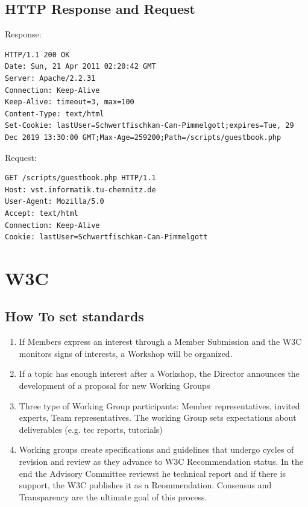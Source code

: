 \documentclass[11pt]{article}
\begin{document}
\subsection{HTTP Response and Request}
\label{sec:orga3498c2}
Response:
\lstset{breaklines=true,language=sh,label= ,caption= ,captionpos=b,numbers=none}
\begin{lstlisting}
HTTP/1.1 200 OK
Date: Sun, 21 Apr 2011 02:20:42 GMT
Server: Apache/2.2.31
Connection: Keep-Alive
Keep-Alive: timeout=3, max=100
Content-Type: text/html
Set-Cookie: lastUser=Schwertfischkan-Can-Pimmelgott;expires=Tue, 29 Dec 2019 13:30:00 GMT;Max-Age=259200;Path=/scripts/guestbook.php
\end{lstlisting}
Request:
\lstset{breaklines=true,language=sh,label= ,caption= ,captionpos=b,numbers=none}
\begin{lstlisting}
GET /scripts/guestbook.php HTTP/1.1
Host: vst.informatik.tu-chemnitz.de
User-Agent: Mozilla/5.0
Accept: text/html
Connection: Keep-Alive
Cookie: lastUser=Schwertfischkan-Can-Pimmelgott
\end{lstlisting}
\section{W3C}
\label{sec:org03905bc}
\subsection{How To set standards}
\label{sec:org7d2555a}
\begin{enumerate}
\item If Members express an interest through a Member Submission and the W3C monitors signs of interests, a Workshop will be organized.
\item If a topic has enough interest after a Workshop, the Director announces the development of a proposal for new Working Groups
\item Three type of Working Group participants: Member representatives, invited experts, Team representatives. The working Group sets expectations about deliverables (e.g. tec reports, tutorials)
\item Working groups create specifications and guidelines that undergo cycles of revision and review as they advance to W3C Recommendation status. In the end the Advisory Committee reviewst he technical report and if there is support, the W3C publishes it as a Reommendation. Consensus and Transparency are the ultimate goal of this process.
\end{enumerate}
\end{document}
